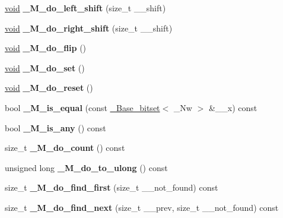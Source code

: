 \begin{DoxyCompactItemize}
\item 
\mbox{\label{struct___base__bitset_a1f17d737b09739017a1dbb3530a6d3a1}} 
\hyperlink{interfacevoid}{void} {\bfseries \+\_\+\+M\+\_\+do\+\_\+left\+\_\+shift} (size\+\_\+t \+\_\+\+\_\+shift)
\item 
\mbox{\label{struct___base__bitset_a9d415dc3cbe724d0b0dbdef782692fe6}} 
\hyperlink{interfacevoid}{void} {\bfseries \+\_\+\+M\+\_\+do\+\_\+right\+\_\+shift} (size\+\_\+t \+\_\+\+\_\+shift)
\item 
\mbox{\label{struct___base__bitset_a872e02ffd5b1abdc784f827deff3542e}} 
\hyperlink{interfacevoid}{void} {\bfseries \+\_\+\+M\+\_\+do\+\_\+flip} ()
\item 
\mbox{\label{struct___base__bitset_a8fbc910454f1fecda38dcee354780523}} 
\hyperlink{interfacevoid}{void} {\bfseries \+\_\+\+M\+\_\+do\+\_\+set} ()
\item 
\mbox{\label{struct___base__bitset_a55c95bd848edd7636c574288a3ec6268}} 
\hyperlink{interfacevoid}{void} {\bfseries \+\_\+\+M\+\_\+do\+\_\+reset} ()
\item 
\mbox{\label{struct___base__bitset_aed05d2e84dec37d5685645a78b435d37}} 
bool {\bfseries \+\_\+\+M\+\_\+is\+\_\+equal} (const \hyperlink{struct___base__bitset}{\+\_\+\+Base\+\_\+bitset}$<$ \+\_\+\+Nw $>$ \&\+\_\+\+\_\+x) const
\item 
\mbox{\label{struct___base__bitset_a66cae7595e499eb967e216167125d6c4}} 
bool {\bfseries \+\_\+\+M\+\_\+is\+\_\+any} () const
\item 
\mbox{\label{struct___base__bitset_a01b438b5bee9bf7405824e75e0f1c929}} 
size\+\_\+t {\bfseries \+\_\+\+M\+\_\+do\+\_\+count} () const
\item 
\mbox{\label{struct___base__bitset_a9ead9a210b99d3fd3aefe4ced488d03b}} 
unsigned long {\bfseries \+\_\+\+M\+\_\+do\+\_\+to\+\_\+ulong} () const
\item 
\mbox{\label{struct___base__bitset_ac4ab80364b5e8611470e81e3263e6d40}} 
size\+\_\+t {\bfseries \+\_\+\+M\+\_\+do\+\_\+find\+\_\+first} (size\+\_\+t \+\_\+\+\_\+not\+\_\+found) const
\item 
\mbox{\label{struct___base__bitset_a33331d95e849ea1dde64ee1e9283b2a7}} 
size\+\_\+t {\bfseries \+\_\+\+M\+\_\+do\+\_\+find\+\_\+next} (size\+\_\+t \+\_\+\+\_\+prev, size\+\_\+t \+\_\+\+\_\+not\+\_\+found) const
\end{DoxyCompactItemize}

